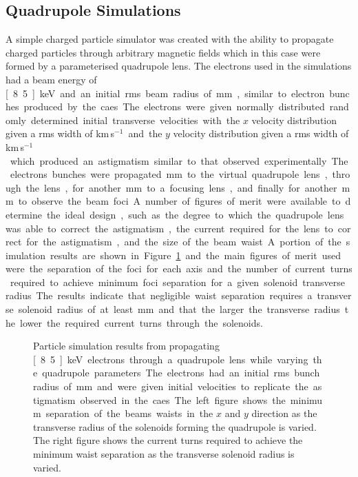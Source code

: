 \subsection{Quadrupole Simulations}

A simple charged particle simulator was created with the ability to propagate charged particles through arbitrary magnetic fields which in this case were formed by a parameterised quadrupole lens.
The electrons used in the simulations had a beam energy of \unit[8.5]{keV} and an initial \gls{rms} beam radius of \unit[5]{mm}, similar to electron bunches produced by the \gls{caes}.
The electrons were given normally distributed randomly determined initial transverse velocities with the $x$ velocity distribution given a \gls{rms} width of \unit[10]{km\,s$^{-1}$} and the $y$ velocity distribution given a \gls{rms} width of \unit[20]{km\,s$^{-1}$} which produced an astigmatism similar to that observed experimentally.
The electrons bunches were propagated \unit[250]{mm} to the virtual quadrupole lens, through the lens, for another \unit[250]{mm} to a focusing lens, and finally for another \unit[500]{mm} to observe the beam foci.
A number of figures of merit were available to determine the ideal design, such as the degree to which the quadrupole lens was able to correct the astigmatism, the current required for the lens to correct for the astigmatism, and the size of the beam waist.

A portion of the simulation results are shown in Figure~\ref{figure:quad_sims} and the main figures of merit used were the separation of the foci for each axis and the number of current turns required to achieve minimum foci separation for a given solenoid transverse radius.
The results indicate that negligible waist separation requires a transverse solenoid radius of at least \unit[35]{mm} and that the larger the transverse radius the lower the required current turns through the solenoids.

\begin{figure}
    \centering
    
    \caption[Quadrupole simulation results.]{Particle simulation results from propagating \unit[8.5]{keV} electrons through a quadrupole lens while varying the quadrupole parameters. The electrons had an initial \gls{rms} bunch radius of \unit[5]{mm} and were given initial velocities to replicate the astigmatism observed in the \gls{caes}. The left figure shows the minimum separation of the beams waists in the $x$ and $y$ direction as the transverse radius of the solenoids forming the quadrupole is varied. The right figure shows the current turns required to achieve the minimum waist separation as the transverse solenoid radius is varied.}
    \label{figure:quad_sims}
\end{figure}

